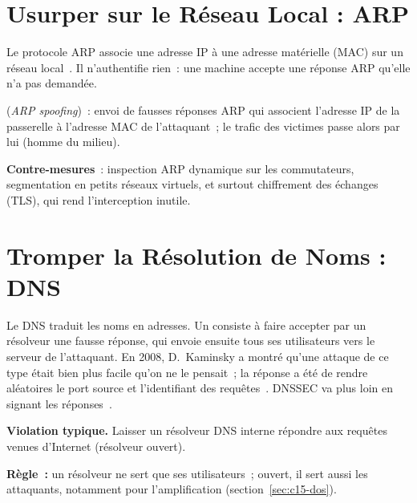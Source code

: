 \section{Usurper sur le Réseau Local : ARP}
\label{sec:c15-arp}

Le protocole ARP associe une adresse IP à une adresse matérielle (MAC) sur
un réseau local~\cite{rfc826}. Il n'authentifie rien~: une machine accepte
une réponse ARP qu'elle n'a pas demandée.

\begin{boxdef}
 (\textit{ARP spoofing})~: envoi de fausses
réponses ARP qui associent l'adresse IP de la passerelle à l'adresse MAC
de l'attaquant~; le trafic des victimes passe alors par lui (homme du
milieu).
\end{boxdef}

\textbf{Contre-mesures}~: inspection ARP dynamique sur les commutateurs,
segmentation en petits réseaux virtuels, et surtout chiffrement des
échanges (TLS), qui rend l'interception inutile.

\section{Tromper la Résolution de Noms : DNS}
\label{sec:c15-dns}

Le DNS traduit les noms en adresses. Un 
consiste à faire accepter par un résolveur une fausse réponse, qui envoie
ensuite tous ses utilisateurs vers le serveur de l'attaquant. En 2008,
D.~Kaminsky a montré qu'une attaque de ce type était bien plus facile
qu'on ne le pensait~; la réponse a été de rendre aléatoires le port
source et l'identifiant des requêtes~\cite{rfc5452}. DNSSEC va plus loin
en signant les réponses~\cite{rfc4033}.

\begin{boxalert}
\textbf{Violation typique.} Laisser un résolveur DNS interne répondre aux
requêtes venues d'Internet (résolveur ouvert).

\smallskip
\textbf{Règle~:} un résolveur ne sert que ses utilisateurs~; ouvert, il
sert aussi les attaquants, notamment pour l'amplification
(section~\ref{sec:c15-dos}).
\end{boxalert}

